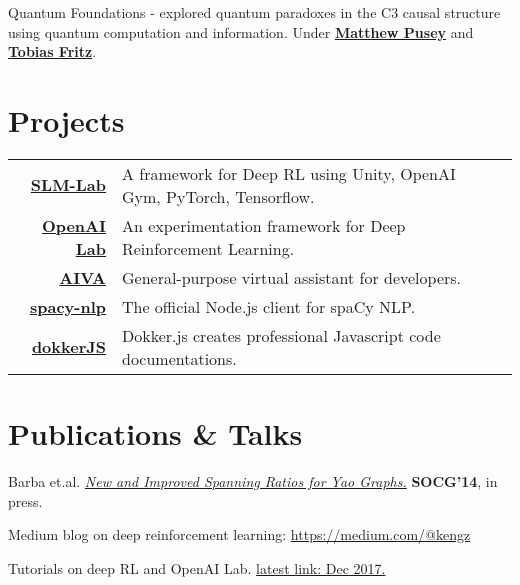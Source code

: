 \documentclass{deedy-resume-openfont}
\begin{document}
\begin{minipage}[t]{0.66\textwidth}
Quantum Foundations - explored quantum paradoxes in the C3 causal structure using quantum computation and information. Under \textbf{\href{https://www.mattpusey.uk/}{Matthew Pusey}} and \textbf{\href{http://perimeterinstitute.ca/personal/tfritz/}{Tobias Fritz}}.
\sectionsep


\section{Projects}
\begin{tabular}{rll}

\href{https://github.com/kengz/SLM-Lab}{\bf SLM-Lab}  & A framework for Deep RL using Unity, OpenAI Gym, PyTorch, Tensorflow.\\
\href{https://github.com/kengz/openai_lab}{\bf OpenAI Lab}  & An experimentation framework for Deep Reinforcement Learning.\\
\href{https://github.com/kengz/aiva}{\bf AIVA}  & General-purpose virtual assistant for developers.\\
\href{https://github.com/kengz/spacy-nlp}{\bf spacy-nlp}  & The official Node.js client for spaCy NLP.\\
\href{https://github.com/kengz/dokker}{\bf dokkerJS}  &  Dokker.js creates professional Javascript code documentations. \\
\end{tabular}
\sectionsep



\section{Publications \& Talks}
\begin{enumerate}[ {[}1{]} ]
\setlength{\itemsep}{0pt}
\setlength{\parskip}{0pt}

\item Barba et.al. \href{http://arxiv.org/pdf/1307.5829.pdf}{\em New and Improved Spanning Ratios for Yao Graphs.} {\bf SOCG'14}, in press.
\item Medium blog on deep reinforcement learning: \href{https://medium.com/@kengz}{https://medium.com/@kengz}
\item Tutorials on deep RL and OpenAI Lab.  \href{https://insights.untapt.com/openai-lab-for-deep-reinforcement-learning-experimentation-6287867eb611}{latest link: Dec 2017.}
\end{enumerate}
\sectionsep



\end{minipage}
\end{document}
